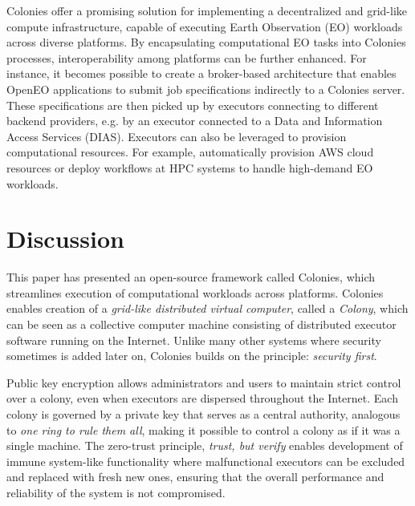 \documentclass{article}
\begin{document}

Colonies offer a promising solution for implementing a decentralized and grid-like compute infrastructure, capable of executing Earth Observation (EO) workloads across diverse platforms. By encapsulating computational EO tasks into Colonies processes, interoperability among platforms can be further enhanced. For instance, it becomes possible to create a broker-based architecture that enables OpenEO applications to submit job specifications indirectly to a Colonies server. These specifications are then picked up by executors connecting to different backend providers, e.g. by an executor connected to a Data and Information Access Services (DIAS). Executors can also be leveraged to provision computational resources. For example, automatically provision AWS cloud resources or deploy workflows at HPC systems to handle high-demand EO workloads. 

\section{Discussion}
This paper has presented an open-source framework called Colonies, which streamlines execution of computational workloads across platforms. Colonies enables creation of a \emph{grid-like distributed virtual computer}, called a \emph{Colony}, which can be seen as a collective computer machine consisting of distributed executor software running on the Internet. Unlike many other systems where security sometimes is added later on, Colonies builds on the principle: \emph{security first}.

Public key encryption allows administrators and users to maintain strict control over a colony, even when executors are dispersed throughout the Internet. Each colony is governed by a private key that serves as a central authority, analogous to \emph{one ring to rule them all}, making it possible to control a colony as if it was a single machine. The zero-trust principle, \emph{trust, but verify} enables development of immune system-like functionality where malfunctional executors can be excluded and replaced with fresh new ones, ensuring that the overall performance and reliability of the system is not compromised. 
\end{document}
